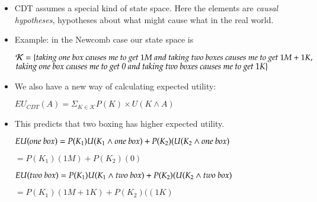 \documentclass[justified]{tufte-handout}
\begin{document}
\begin{itemize}

\item CDT assumes a special kind of state space. Here the elements are \emph{causal hypotheses}, hypotheses about what might cause what in the real world. 


\item Example: in the Newcomb case our state space is

 $\mathcal{K} = \{\emph{taking one box causes me to get $1M$ and taking two boxes causes me to get $1M+1K$},$ \\$\emph{taking one box causes me to get 0 and taking two boxes causes me to get $1K$}\}$


\item We also have a new way of calculating expected utility:

$EU_{CDT}(A) = \Sigma_{K\in\mathcal{K}} P(K) \times U(K \wedge A)$


\item This predicts that two boxing has higher expected utility.

\vspace{.2cm}

\noindent $EU(\emph{one box})= P(K_1)U(K_1 \wedge \emph{one box}) + P(K_2)(U(K_2 \wedge \emph{one box})$

$= P(K_1)(1M) + P(K_2)(0)$

\vspace{.2cm}

\noindent $EU(\emph{two box})= P(K_1)U(K_1 \wedge \emph{two box}) + P(K_2)(U(K_2 \wedge \emph{two box})$

$=P(K_1)(1M+1K) + P(K_2)((1K)$

\end{itemize}
\end{document}
